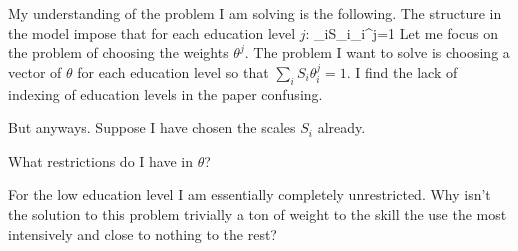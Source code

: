 \documentclass[a4paper, 12pt]{article}
\begin{document}
 My understanding of the problem I am solving is the following. The structure in the model impose that for each education level $j$:
 \beqn
	\sum_iS_i\theta_i^j=1
 \eeqn
Let me focus on the problem of choosing the weights $\theta^j$. The problem I want to solve is choosing a vector of $\theta$ for each education level so that $\sum_iS_i\theta_i^j=1$. I find the lack of indexing of education levels in the paper confusing.

But anyways. Suppose I have chosen the scales $S_i$ already.
\benu
	\item What restrictions do I have in $\theta$? 
	\item For the low education level I am essentially completely unrestricted. Why isn't the solution to this problem trivially a ton of weight to the skill the use the most intensively and close to nothing to the rest?
	\item 
\eenu
\end{document}
